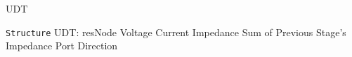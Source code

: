 %
\begin{algorithm}[H]
    \caption{UDT}
    \label{alg:resUDT}
    \begin{algorithmic}[1]
        \State \verb+Structure+ UDT: resNode
        \State Voltage
        \State Current
        \State Impedance 
        \State Sum of Previous Stage's Impedance 
        \State Port Direction 
    \end{algorithmic}
\end{algorithm}
